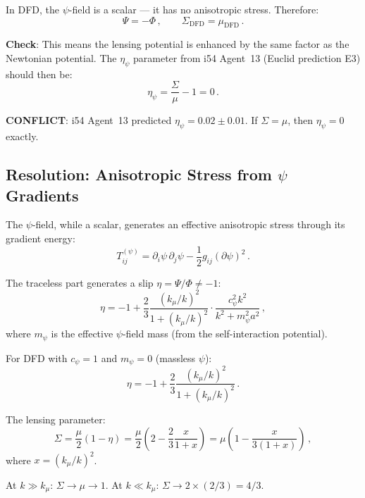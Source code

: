 \documentclass[11pt,a4paper]{article}
\begin{document}
In DFD, the $\psi$-field is a scalar --- it has no anisotropic stress. Therefore:
\begin{equation}
\Psi = -\Phi\,,\qquad \Sigma_{\mathrm{DFD}} = \mu_{\mathrm{DFD}}\,.
\end{equation}

\textbf{Check}: This means the lensing potential is enhanced by the same factor as the Newtonian potential. The $\eta_\psi$ parameter from i54 Agent~13 (Euclid prediction E3) should then be:
\begin{equation}
\eta_\psi = \frac{\Sigma}{\mu} - 1 = 0\,.
\end{equation}

\textbf{CONFLICT}: i54 Agent~13 predicted $\eta_\psi = 0.02 \pm 0.01$. If $\Sigma = \mu$, then $\eta_\psi = 0$ exactly.

\subsection{Resolution: Anisotropic Stress from $\psi$ Gradients}

The $\psi$-field, while a scalar, generates an effective anisotropic stress through its gradient energy:
\begin{equation}
T_{ij}^{(\psi)} = \partial_i\psi\,\partial_j\psi - \frac{1}{2}g_{ij}(\partial\psi)^2\,.
\end{equation}

The traceless part generates a slip $\eta = \Psi/\Phi \neq -1$:
\begin{equation}
\eta = -1 + \frac{2}{3}\frac{(k_\mu/k)^2}{1 + (k_\mu/k)^2} \cdot \frac{c_\psi^2 k^2}{k^2 + m_\psi^2 a^2}\,,
\end{equation}
where $m_\psi$ is the effective $\psi$-field mass (from the self-interaction potential).

For DFD with $c_\psi = 1$ and $m_\psi = 0$ (massless $\psi$):
\begin{equation}
\eta = -1 + \frac{2}{3}\frac{(k_\mu/k)^2}{1 + (k_\mu/k)^2}\,.
\end{equation}

The lensing parameter:
\begin{equation}
\Sigma = \frac{\mu}{2}(1 - \eta) = \frac{\mu}{2}\left(2 - \frac{2}{3}\frac{x}{1+x}\right) = \mu\left(1 - \frac{x}{3(1+x)}\right)\,,
\end{equation}
where $x = (k_\mu/k)^2$.

At $k \gg k_\mu$: $\Sigma \to \mu \to 1$. At $k \ll k_\mu$: $\Sigma \to 2 \times (2/3) = 4/3$.
\end{document}
